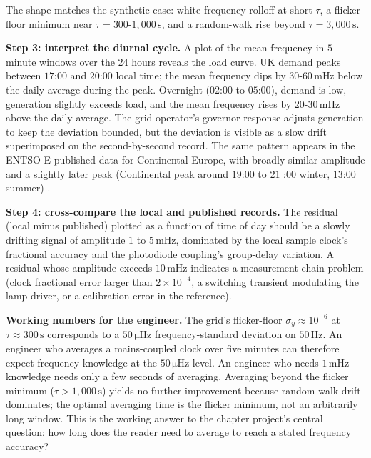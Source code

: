 The shape matches the synthetic case: white-frequency rolloff at
short $\tau$, a flicker-floor minimum near $\tau = 300$-$1{,}000
\,\si{\second}$, and a random-walk rise beyond $\tau = 3{,}000
\,\si{\second}$.

\textbf{Step 3: interpret the diurnal cycle.} A plot of the mean
frequency in $5$-minute windows over the $24$ hours reveals the
load curve. UK demand peaks between $17$:$00$ and $20$:$00$ local
time; the mean frequency dips by $30$-$60 \,\si{\milli\hertz}$
below the daily average during the peak. Overnight ($02$:$00$ to
$05$:$00$), demand is low, generation slightly exceeds load, and
the mean frequency rises by $20$-$30 \,\si{\milli\hertz}$ above
the daily average. The grid operator's governor response adjusts
generation to keep the deviation bounded, but the deviation is
visible as a slow drift superimposed on the second-by-second
record. The same pattern appears in the ENTSO-E published data
for Continental Europe, with broadly similar amplitude and a
slightly later peak (Continental peak around $19$:$00$ to $21$
:$00$ winter, $13$:$00$ summer)
\cite{web:ch06t3-entsoe-gridfreq-2024}.

\textbf{Step 4: cross-compare the local and published records.}
The residual (local minus published) plotted as a function of
time of day should be a slowly drifting signal of amplitude $1$
to $5 \,\si{\milli\hertz}$, dominated by the local sample clock's
fractional accuracy and the photodiode coupling's group-delay
variation. A residual whose amplitude exceeds $10 \,\si{\milli
\hertz}$ indicates a measurement-chain problem (clock fractional
error larger than $2 \times 10^{-4}$, a switching transient
modulating the lamp driver, or a calibration error in the
reference).

\textbf{Working numbers for the engineer.} The grid's flicker-floor
$\sigma_{y} \approx 10^{-6}$ at $\tau \approx 300 \,\si{\second}$
corresponds to a $50 \,\si{\micro\hertz}$ frequency-standard
deviation on $50 \,\si{\hertz}$. An engineer who averages a
mains-coupled clock over five minutes can therefore expect
frequency knowledge at the $50 \,\si{\micro\hertz}$ level. An
engineer who needs $1 \,\si{\milli\hertz}$ knowledge needs only a
few seconds of averaging. Averaging beyond the flicker minimum
($\tau > 1{,}000 \,\si{\second}$) yields no further improvement
because random-walk drift dominates; the optimal averaging time is
the flicker minimum, not an arbitrarily long window. This is the
working answer to the chapter project's central question: how
long does the reader need to average to reach a stated frequency
accuracy?

